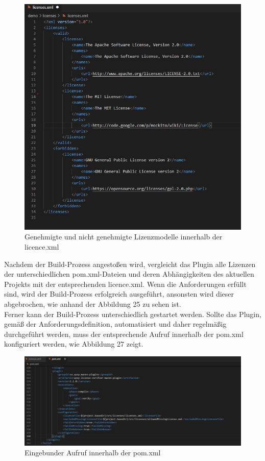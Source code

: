 \begin{figure}[h]
    \centering
    \includegraphics[scale=0.45]{Bilder/licencesxml.png}
    \caption{Genehmigte und nicht genehmigte Lizenzmodelle innerhalb der licence.xml}
\end{figure}

Nachdem der Build-Prozess angestoßen wird, vergleicht das Plugin alle Lizenzen der unterschiedlichen pom.xml-Dateien und deren Abhängigkeiten des aktuellen Projekts mit der entsprechenden licence.xml. Wenn die Anforderungen erfüllt sind, wird der Build-Prozess erfolgreich ausgeführt, ansonsten wird dieser abgebrochen, wie anhand der Abbildung 25 zu sehen ist.\\ Ferner kann der Build-Prozess unterschiedlich gestartet werden. Sollte das Plugin, gemäß der Anforderungsdefinition, automatisiert und daher regelmäßig durchgeführt werden, muss der entsprechende Aufruf innerhalb der pom.xml konfiguriert werden, wie Abbildung 27 zeigt. 

\begin{figure}[h]
    \centering
    \includegraphics[scale=0.45]{Bilder/PluginConfigurationzumAufruf.png}
    \caption{Eingebunder Aufruf innerhalb der pom.xml}
\end{figure}


